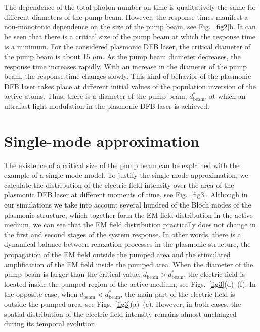 \documentclass[aps,pra,amsmath,amssymb,onecolumn,superscriptaddress,showpacs,floatfix,]{revtex4-1}
\begin{document}
The dependence of the total photon number on time is qualitatively the same for different diameters of the pump beam.
However, the response times manifest a non-monotonic dependence on the size of the pump beam, see Fig.~\ref{fig2}b.
It can be seen that there is a critical size of the pump beam at which the response time is a minimum.
For the considered plasmonic DFB laser, the critical diameter of the pump beam is about 15 $\mu$m.
As the pump beam diameter decreases, the response time increases rapidly.
With an increase in the diameter of the pump beam, the response time changes slowly.
This kind of behavior of the plasmonic DFB laser takes place at different initial values of the population inversion of the active atoms.
Thus, there is a diameter of the pump beam, $d_{\text{beam}}^*$, at which an ultrafast light modulation in the plasmonic DFB laser is achieved.

\section*{Single-mode approximation}

The existence of a critical size of the pump beam can be explained with the example of a single-mode model. To justify the single-mode approximation, we calculate the distribution of the electric field intensity over the area of the plasmonic DFB laser at different moments of time, see Fig.~\ref{fig3}.
Although in our simulations we take into account several hundred of the Bloch modes of the plasmonic structure, which together form the EM field distribution in the active medium, we can see that the EM field distribution practically does not change in the first and second stages of the system response. In other words, there is a dynamical balance between relaxation processes in the plasmonic structure, the propagation of the EM field outside the pumped area and the stimulated amplification of the EM field inside the pumped area. When the diameter of the pump beam is larger than the critical value, $d_{\text{beam}} > d_{\text{beam}}^*$, the electric field is located inside the pumped region of the active medium, see Figs.~\ref{fig3}(d)--(f).
In the opposite case, when $d_{\text{beam}} < d_{\text{beam}}^*$, the main part of the electric field is outside the pumped area, see Figs.~\ref{fig3}(a)--(c).
However, in both cases, the spatial distribution of the electric field intensity remains almost unchanged during its temporal evolution. 
\end{document}

